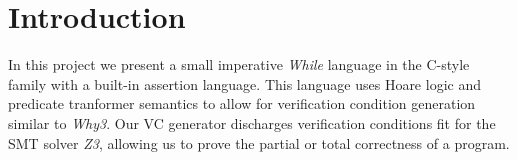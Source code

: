 \section{Introduction}












In this project we present a small imperative \textit{While} language in the C-style family with a built-in assertion language.
This language uses Hoare logic and predicate tranformer semantics to allow for verification condition generation similar to \textit{Why3}.
Our VC generator discharges verification conditions fit for the SMT solver \textit{Z3}, allowing us to prove the partial or total correctness of a program.

